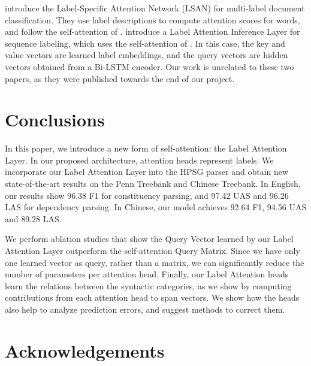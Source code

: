 \documentclass[11pt,a4paper]{article}
\begin{document}
\citet{xiao2019label} introduce the Label-Specific Attention Network (LSAN) for multi-label document classification. They use label descriptions to compute attention scores for words, and follow the self-attention of \citet{lin2017structured}. \citet{cui2019hierarchically} introduce a Label Attention Inference Layer for sequence labeling, which uses the self-attention of \citet{vaswani2017attention}. In this case, the key and value vectors are learned label embeddings, and the query vectors are hidden vectors obtained from a Bi-LSTM encoder. Our work is unrelated to these two papers, as they were published towards the end of our project.






















\section{Conclusions}
\label{section_conc}

In this paper, we introduce a new form of self-attention: the Label Attention Layer. In our proposed architecture, attention heads represent labels. We incorporate our Label Attention Layer into the HPSG parser \cite{zhou2019head} and obtain new state-of-the-art results on the Penn Treebank and Chinese Treebank. In English, our results show 96.38 F1 for constituency parsing, and 97.42 UAS and 96.26 LAS for dependency parsing. In Chinese, our model achieves 92.64 F1, 94.56 UAS and 89.28 LAS. 

We perform ablation studies that show the Query Vector learned by our Label Attention Layer outperform the self-attention Query Matrix.  Since we have only one learned vector as query, rather than a matrix, we can significantly reduce the number of parameters per attention head. Finally, our Label Attention heads learn the relations between the syntactic categories, as we show by computing contributions from each attention head to span vectors. We show how the heads also help to analyze prediction errors, and suggest methods to correct them.

\section*{Acknowledgements}
\end{document}
